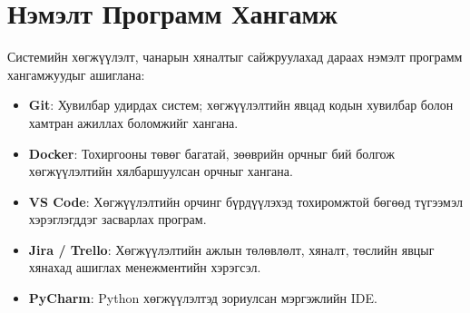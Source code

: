 \section{Нэмэлт Программ Хангамж}
Системийн хөгжүүлэлт, чанарын хяналтыг сайжруулахад дараах нэмэлт программ хангамжуудыг ашиглана:
\begin{itemize}
    \item \textbf{Git}: Хувилбар удирдах систем; хөгжүүлэлтийн явцад кодын хувилбар болон хамтран ажиллах боломжийг хангана.
    \item \textbf{Docker}: Тохиргооны төвөг багатай, зөөврийн орчныг бий болгож хөгжүүлэлтийн хялбаршуулсан орчныг хангана.
    \item \textbf{VS Code}: Хөгжүүлэлтийн орчинг бүрдүүлэхэд тохиромжтой бөгөөд түгээмэл хэрэглэгддэг засварлах програм.
    \item \textbf{Jira / Trello}: Хөгжүүлэлтийн ажлын төлөвлөлт, хяналт, төслийн явцыг хянахад ашиглах менежментийн хэрэгсэл.
    \item \textbf{PyCharm}: Python хөгжүүлэлтэд зориулсан мэргэжлийн IDE.
\end{itemize}
